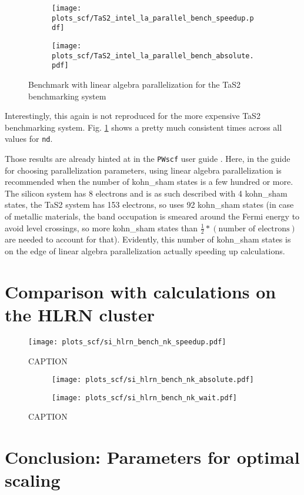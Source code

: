 \documentclass[main.tex]{subfiles}
\begin{document}
\begin{figure}[ht!]
\begin{subfigure}[b]{0.49\textwidth}
    \centering
    \texttt{[image: plots\_scf/TaS2\_intel\_la\_parallel\_bench\_speedup.pdf]}
\end{subfigure}
\begin{subfigure}[b]{0.49\textwidth}
    \centering
    \texttt{[image: plots\_scf/TaS2\_intel\_la\_parallel\_bench\_absolute.pdf]}
\end{subfigure}
\label{fig:scaling_scf_nd_tas2}
\caption{Benchmark with linear algebra parallelization for the TaS2 benchmarking system}
\end{figure}

Interestingly, this again is not reproduced for the more expensive TaS2 benchmarking system.
Fig. \ref{fig:scaling_scf_nd_tas2} shows a pretty much consistent times across all values for \texttt{nd}.

Those results are already hinted at in the \texttt{PWscf} user guide \cite{noauthor_pwscf_nodate}.
Here, in the guide for choosing parallelization parameters, using linear algebra parallelization is recommended when the number of \acrshort{kohn_sham} states is a few hundred or more.
The silicon system has 8 electrons and is as such described with 4 \gls{kohn_sham} states, the TaS2 system has 153 electrons, so \QE uses 92 \gls{kohn_sham} states (in case of metallic materials, the band occupation is smeared around the Fermi energy to avoid level crossings, so more \gls{kohn_sham} states than \(\frac{1}{2} * (\textrm{number of electrons})\) are needed to account for that).
Evidently, this number of \acrshort{kohn_sham} states is on the edge of linear algebra parallelization actually speeding up calculations.

\section{Comparison with calculations on the HLRN cluster}

\begin{figure}[ht!]
\centering
\texttt{[image: plots\_scf/si\_hlrn\_bench\_nk\_speedup.pdf]}
\caption{CAPTION}
\label{fig:scaling_scf_hlrn_nk_si_speedup}
\end{figure}

\begin{figure}[ht!]
\begin{subfigure}[b]{0.49\textwidth}
    \centering
    \texttt{[image: plots\_scf/si\_hlrn\_bench\_nk\_absolute.pdf]}
\end{subfigure}
\begin{subfigure}[b]{0.49\textwidth}
    \centering
    \texttt{[image: plots\_scf/si\_hlrn\_bench\_nk\_wait.pdf]}
\end{subfigure}
\caption{CAPTION}
\label{fig:scaling_scf_hlrn_nprocs_nk_absolute_wait}
\end{figure}

\section{Conclusion: Parameters for optimal scaling}
\end{document}
